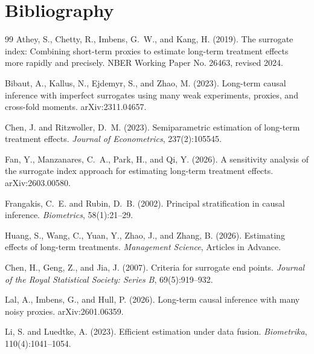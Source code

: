 \documentclass[11pt]{article}
\theoremstyle{definition}
\theoremstyle{plain}
\theoremstyle{remark}
\begin{document}
\section*{Bibliography}
\begin{thebibliography}{99}
Athey, S., Chetty, R., Imbens, G.~W., and Kang, H. (2019).
\newblock The surrogate index: Combining short-term proxies to estimate long-term treatment effects more rapidly and precisely.
\newblock NBER Working Paper No. 26463, revised 2024.

Bibaut, A., Kallus, N., Ejdemyr, S., and Zhao, M. (2023).
\newblock Long-term causal inference with imperfect surrogates using many weak experiments, proxies, and cross-fold moments.
\newblock arXiv:2311.04657.

Chen, J. and Ritzwoller, D.~M. (2023).
\newblock Semiparametric estimation of long-term treatment effects.
\newblock \emph{Journal of Econometrics}, 237(2):105545.

Fan, Y., Manzanares, C.~A., Park, H., and Qi, Y. (2026).
\newblock A sensitivity analysis of the surrogate index approach for estimating long-term treatment effects.
\newblock arXiv:2603.00580.

Frangakis, C.~E. and Rubin, D.~B. (2002).
\newblock Principal stratification in causal inference.
\newblock \emph{Biometrics}, 58(1):21--29.

Huang, S., Wang, C., Yuan, Y., Zhao, J., and Zhang, B. (2026).
\newblock Estimating effects of long-term treatments.
\newblock \emph{Management Science}, Articles in Advance.

Chen, H., Geng, Z., and Jia, J. (2007).
\newblock Criteria for surrogate end points.
\newblock \emph{Journal of the Royal Statistical Society: Series B}, 69(5):919--932.

Lal, A., Imbens, G., and Hull, P. (2026).
\newblock Long-term causal inference with many noisy proxies.
\newblock arXiv:2601.06359.

Li, S. and Luedtke, A. (2023).
\newblock Efficient estimation under data fusion.
\newblock \emph{Biometrika}, 110(4):1041--1054.


\end{thebibliography}
\end{document}
